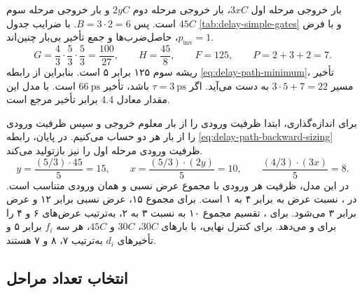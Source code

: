 بار خروجی مرحله اول \(3xC\)، بار خروجی مرحله دوم \(2yC\)
و بار خروجی مرحله سوم \(45C\) است. پس \(B=3\cdot2=6\).
با ضرایب جدول \ref{tab:delay-simple-gates} و با فرض
\(p_{\mathrm{inv}}=1\)، حاصل‌ضرب‌ها و جمع تأخیر بی‌بار چنین‌اند.
\[
  G=\frac43\cdot\frac53\cdot\frac53=\frac{100}{27},
  \qquad H=\frac{45}{8},\qquad F=125,\qquad P=2+3+2=7.
\]
ریشه سوم ۱۲۵ برابر ۵ است. بنابراین از رابطه
\eqref{eq:delay-path-minimum}، تأخیر مسیر \(3\cdot5+7=22\)
به دست می‌آید. اگر \(\tau=\qty{3}{\pico\second}\) باشد،
تأخیر \(\qty{66}{\pico\second}\) است. با مدل
\hyperref[sec:delay-fo4]{} این مقدار معادل
\num{4.4} برابر تأخیر مرجع  است.

برای اندازه‌گذاری، ابتدا ظرفیت ورودی  را از بار معلوم
خروجی و سپس ظرفیت ورودی  را از بار هر دو
 حساب می‌کنیم. در پایان، رابطه
\eqref{eq:delay-path-backward-sizing} ظرفیت ورودی مرحله اول
را نیز بازتولید می‌کند.
\[
  y=\frac{(5/3)\cdot45}{5}=15,\qquad
  x=\frac{(5/3)\cdot(2y)}{5}=10,\qquad
  \frac{(4/3)\cdot(3x)}{5}=8.
\]
در این مدل، ظرفیت هر ورودی با مجموع عرض نسبی  و
 همان ورودی متناسب است. در ، نسبت
عرض  به  برابر ۴ به ۱ است. برای مجموع ۱۵،
عرض نسبی  برابر ۱۲ و عرض  برابر ۳ می‌شود.
برای ، تقسیم مجموع ۱۰ به نسبت ۳ به ۲، به‌ترتیب
عرض‌های ۶ و ۴ را برای  و  می‌دهد.
برای کنترل نهایی، با بارهای \(30C\)، \(30C\) و \(45C\)،
هر سه \(f_i\) برابر ۵ و تأخیرهای \(d_i\) به‌ترتیب ۷،
۸ و ۷ هستند.

\subsection{انتخاب تعداد مراحل}
\label{sec:delay-path-stage-count}

